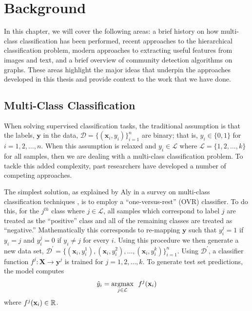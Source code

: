 \documentclass[../thesis.tex]{subfiles}
\begin{document}
\chapter{Background}

In this chapter, we will cover the following areas: a brief history on how
multi-class classification has been performed, recent approaches to the
hierarchical classification problem, modern approaches to extracting useful
features from images and text, and a brief overview of community detection
algorithms on graphs. These areas highlight the major ideas that underpin the
approaches developed in this thesis and provide context to the work that we have
done.

\section{Multi-Class Classification}
When solving supervised classification tasks, the traditional assumption is that
the labels, $\mathbf{y}$ in the data, $\mathcal{D} = \{(\mathbf{x}_i,
y_i)\}_{i=1}^n$ are binary; that is, $y_i \in \{0, 1\}$ for $i = 1, 2, \ldots,
n$. When this assumption is relaxed and $y_i \in \mathcal{L}$ where $\mathcal{L} =
\{1, 2, \ldots, k\}$ for all samples, then we are dealing with a multi-class
classification problem. To tackle this added complexity, past researchers have
developed a number of competing approaches.

The simplest solution, as explained by Aly in a survey on multi-class
classification techniques \cite{aly2005survey}, is to employ a
``one-versus-rest'' (OVR) classifier. To do this, for the $j^{th}$ class where
$j \in \mathcal{L}$, all samples which correspond to label $j$ are treated as
the ``positive'' class and all of the remaining classes are treated as
``negative.'' Mathematically this corresponds to re-mapping $\mathbf{y}$ such
that $y_i^j = 1$ if $y_i = j$ and $y_i^j = 0$ if $y_i \neq j$ for every $i$.
Using this procedure we then generate a new data set, $\mathcal{D}^\prime =
\{(\mathbf{x}_i, y_i^1), (\mathbf{x}_i, y_i^2), \ldots, (\mathbf{x}_i,
y_i^k)\}_{i=1}^n$. Using $\mathcal{D}^\prime$, a classifier function $f^j:
\mathbf{X} \rightarrow \mathbf{y}^j$ is trained for $j = 1, 2, \ldots, k.$ To
generate test set predictions, the model computes
\begin{equation}
    \label{eq:ovr_pred}
    \hat{y}_i = \underset{j \in \mathcal{L}}{\argmax} \ \  f^j(\mathbf{x}_i)
\end{equation}
where $f^j(\mathbf{x}_i) \in \mathbb{R}$.
\end{document}

